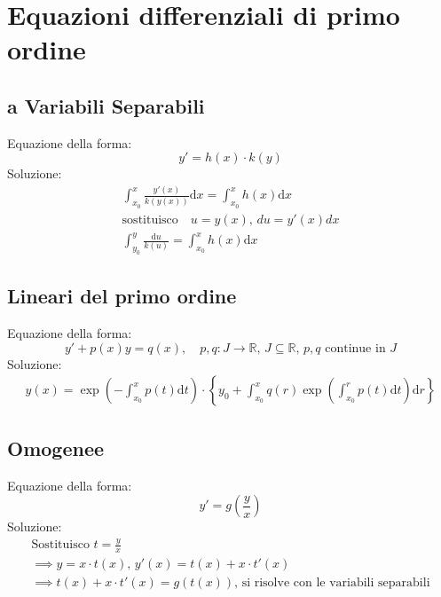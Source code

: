 \documentclass[a4paper]{article}
\newcommand{\numberset}{\mathbb}
\newcommand{\R}{\numberset{R}}
\theoremstyle{plain}
\newtheorem{Teo}{Teorema}
\begin{document}
\section {Equazioni differenziali di primo ordine}


    

\subsection{a Variabili Separabili}

Equazione della forma:
\begin{equation*}
    y'=h(x)\cdot k(y)
\end{equation*}
Soluzione:
\begin{gather*}
    \int_{x_0}^x{\frac{y'(x)}{k(y(x))}\text{d}x}=\int_{x_0}^{x}{h(x)\text{d}x}\\
    \text{sostituisco}\quad u=y(x),\, du=y'(x)dx\\
    \int_{y_0}^y{\frac{\text{d}u}{k(u)}}=\int_{x_0}^{x}{h(x)\text{d}x}
\end{gather*}

\subsection{Lineari del primo ordine}

Equazione della forma:
\begin{equation*}
    y'+p(x)y=q(x),\quad p,q\colon J\to\R,\,J\subseteq\R,\, p,q\text{ continue in }J
\end{equation*}
Soluzione:
\begin{gather*}
    y(x)=\exp \left( -\int_{x_0}^x{p(t)\text{d}t} \right) \cdot
    \left\{ y_0+\int_{x_0}^{x}{q(r)\exp \left(\int_{x_0}^r{p(t)\text{d}t}\right) \text{d}r} \right\}
\end{gather*}

\subsection{Omogenee}

Equazione della forma:
\begin{equation*}
    y'=g\left(\frac{y}{x}\right)    
\end{equation*}
Soluzione: 
\begin{gather*}
    \text{Sostituisco }t=\frac{y}{x}\\
    \implies y=x\cdot t(x),\,y'(x)=t(x)+x\cdot t'(x)\\
    \implies t(x)+x\cdot t'(x)=g(t(x)),\,\text{si risolve con le variabili separabili}
\end{gather*}
\end{document}
